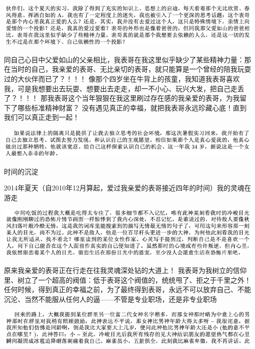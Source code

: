 \documentclass[9pt, b5paper]{article}
\begin{document}
\begin{center}
\includegraphics[width=.9\linewidth]{./pic/backups_plans_20210422_075555.png}
\end{center}

  同自己心目中父爱如山的父亲相比，我表哥在我这里似乎缺少了某些精神力量：那在当时的自己，我亲爱的表哥、无比亲切的表哥，就只能算是一个曾经的陪我玩耍过的大伙伴而已了？！！！
像那个四岁坐在牛背上的孩童，我知道我表哥喜欢我，可是我想要出去玩耍、想要出去走走，却一不小心、玩兴大发，把自己走丢了？！！！
那我表哥这个当年狠狠在我这里刷过存在感的我亲爱的表哥，为我留下了哪些标准精神财富？
没有遇见真正的幸福，就把我表哥永远珍藏心底！直到我们可以真正走到一起！

\begin{center}
\includegraphics[width=.9\linewidth]{./pic/backups_plans_20210422_075830.png}
\end{center}

时间的沉淀

2014年夏天（自2010年12月算起，爱过我亲爱的表哥接近四年的时间）我的灵魂在游走

\begin{center}
\includegraphics[width=.9\linewidth]{./pic/backups_plans_20210422_090949.png}
\end{center}

  原来我亲爱的表哥正在行走在往我灵魂深处钻的大道上！
我表哥为我树立的信仰里、树立了一个超高的阀值：低于表哥这个阀值的，统统甩了、拒之于千里之外！
任何时候，得到真正的幸福之前，为了最终得到表哥，永远不可以放弃自己、不能沉沦、当然不能服从任何人的逼——不管是专业职场，还是非专业职场

\begin{center}
\includegraphics[width=.9\linewidth]{./pic/backups_plans_20210422_091109.png}
\end{center}
\end{document}
